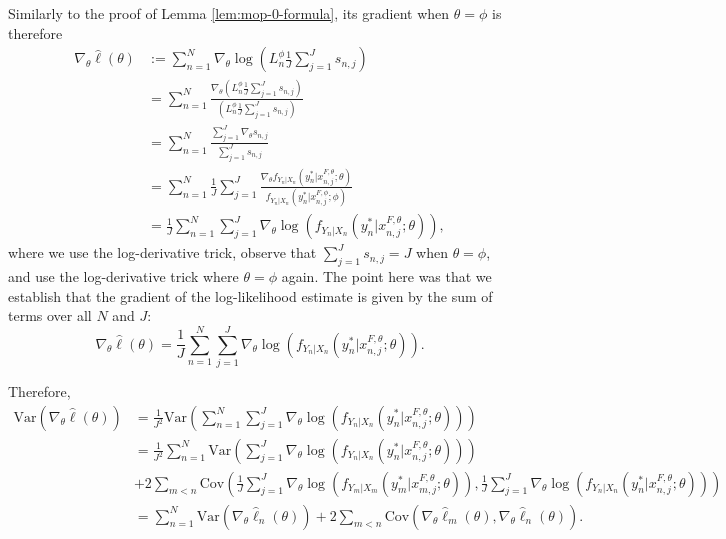 \documentclass{article}
\begin{document}
Similarly to the proof of Lemma \ref{lem:mop-0-formula}, its gradient when $\theta=\phi$ is therefore 
\begin{align*}
    \nabla_\theta \hat{\ell}(\theta) &:= \sum_{n=1}^N \nabla_\theta \log\left(L_n^\phi \frac{1}{J} \sum_{j=1}^J s_{n,j}\right) \\
    &= \sum_{n=1}^N \frac{\nabla_\theta \left(L_n^\phi \frac{1}{J} \sum_{j=1}^J s_{n,j}\right)}{\left(L_n^\phi \frac{1}{J} \sum_{j=1}^J s_{n,j}\right)} \\
    &= \sum_{n=1}^N \frac{\sum_{j=1}^J \nabla_\theta s_{n,j}}{\sum_{j=1}^J s_{n,j}} \\
    &= \sum_{n=1}^N \frac{1}{J} \sum_{j=1}^J \frac{\nabla_\theta f_{Y_n|X_{n}}(y_n^*|x_{n,j}^{F, \theta}; \theta)}{f_{Y_n|X_{n}}(y_n^*|x_{n,j}^{F, \phi}; \phi)} \\
    &= \frac{1}{J} \sum_{n=1}^N \sum_{j=1}^J \nabla_\theta \log\left(f_{Y_n|X_{n}}(y_n^*|x_{n,j}^{F, \theta}; \theta)\right),
\end{align*}
where we use the log-derivative trick, observe that $\sum_{j=1}^J s_{n,j} = J$ when $\theta=\phi$, and use the log-derivative trick where $\theta=\phi$ again. The point here was that we establish that the gradient of the log-likelihood estimate is given by the sum of terms over all $N$ and $J$:
$$\nabla_\theta \hat{\ell}(\theta) = \frac{1}{J} \sum_{n=1}^N \sum_{j=1}^J \nabla_\theta \log\left(f_{Y_n|X_{n}}(y_n^*|x_{n,j}^{F, \theta}; \theta)\right).$$

Therefore,
\begin{align*}
    \text{Var}(\nabla_\theta \hat\ell(\theta)) &= \frac{1}{J^2}\text{Var}\left(\sum_{n=1}^N\sum_{j=1}^{J}\nabla_\theta \log\left(f_{Y_n|X_{n}}(y_n^*|x_{n,j}^{F, \theta}; \theta)\right)\right) \\
    &= \frac{1}{J^2}\sum_{n=1}^N\text{Var}\left(\sum_{j=1}^{J}\nabla_\theta \log\left(f_{Y_n|X_{n}}(y_n^*|x_{n,j}^{F, \theta}; \theta)\right)\right) \\
    &+ 2\sum_{m<n}\text{Cov}\left(\frac{1}{J}\sum_{j=1}^{J}\nabla_\theta \log\left(f_{Y_m|X_{m}}(y_m^*|x_{m,j}^{F, \theta}; \theta)\right), \frac{1}{J}\sum_{j=1}^{J}\nabla_\theta \log\left(f_{Y_n|X_{n}}(y_n^*|x_{n,j}^{F, \theta}; \theta)\right)\right) \\
    &= \sum_{n=1}^N \text{Var}(\nabla_\theta\hat\ell_n(\theta)) + 2\sum_{m<n} \text{Cov}(\nabla_\theta\hat\ell_m(\theta),\nabla_\theta\hat\ell_n(\theta)).
\end{align*}
\end{document}

